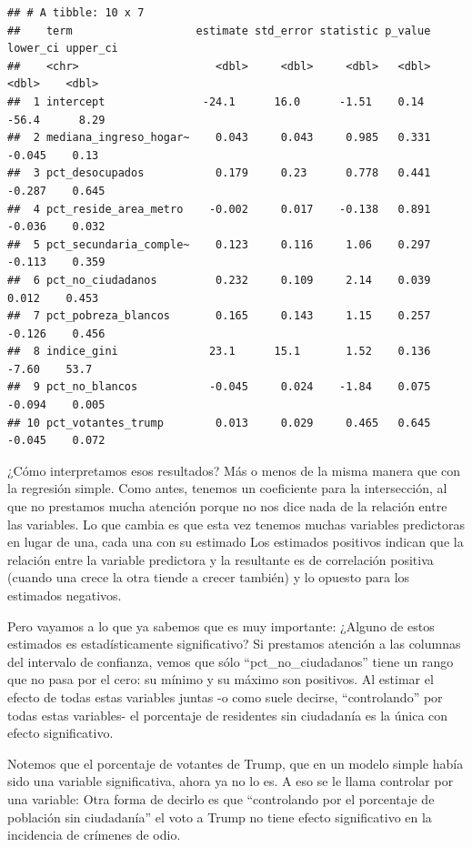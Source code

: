 \documentclass[
]{book}
\begin{document}
\begin{verbatim}
## # A tibble: 10 x 7
##    term                   estimate std_error statistic p_value lower_ci upper_ci
##    <chr>                     <dbl>     <dbl>     <dbl>   <dbl>    <dbl>    <dbl>
##  1 intercept               -24.1      16.0      -1.51    0.14   -56.4      8.29 
##  2 mediana_ingreso_hogar~    0.043     0.043     0.985   0.331   -0.045    0.13 
##  3 pct_desocupados           0.179     0.23      0.778   0.441   -0.287    0.645
##  4 pct_reside_area_metro    -0.002     0.017    -0.138   0.891   -0.036    0.032
##  5 pct_secundaria_comple~    0.123     0.116     1.06    0.297   -0.113    0.359
##  6 pct_no_ciudadanos         0.232     0.109     2.14    0.039    0.012    0.453
##  7 pct_pobreza_blancos       0.165     0.143     1.15    0.257   -0.126    0.456
##  8 indice_gini              23.1      15.1       1.52    0.136   -7.60    53.7  
##  9 pct_no_blancos           -0.045     0.024    -1.84    0.075   -0.094    0.005
## 10 pct_votantes_trump        0.013     0.029     0.465   0.645   -0.045    0.072
\end{verbatim}

¿Cómo interpretamos esos resultados? Más o menos de la misma manera que con la regresión simple. Como antes, tenemos un coeficiente para la intersección, al que no prestamos mucha atención porque no nos dice nada de la relación entre las variables. Lo que cambia es que esta vez tenemos muchas variables predictoras en lugar de una, cada una con su estimado Los estimados positivos indican que la relación entre la variable predictora y la resultante es de correlación positiva (cuando una crece la otra tiende a crecer también) y lo opuesto para los estimados negativos.

Pero vayamos a lo que ya sabemos que es muy importante: ¿Alguno de estos estimados es estadísticamente significativo? Si prestamos atención a las columnas del intervalo de confianza, vemos que sólo ``pct\_no\_ciudadanos'' tiene un rango que no pasa por el cero: su mínimo y su máximo son positivos. Al estimar el efecto de todas estas variables juntas -o como suele decirse, ``controlando'' por todas estas variables- el porcentaje de residentes sin ciudadanía es la única con efecto significativo.

Notemos que el porcentaje de votantes de Trump, que en un modelo simple había sido una variable significativa, ahora ya no lo es. A eso se le llama controlar por una variable: Otra forma de decirlo es que ``controlando por el porcentaje de población sin ciudadanía'' el voto a Trump no tiene efecto significativo en la incidencia de crímenes de odio.
\end{document}
